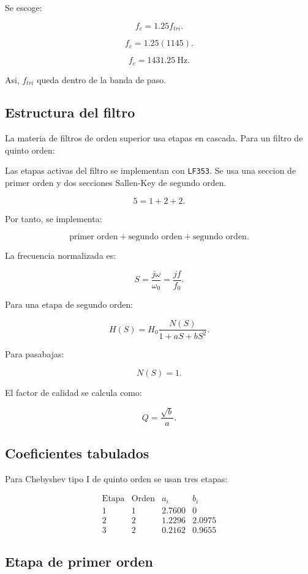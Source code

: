 \documentclass[11pt,letterpaper]{article}
\begin{document}
Se escoge:

\[
f_c=1.25f_{tri}.
\]

\[
f_c=1.25(1145).
\]

\[
\boxed{f_c=1431.25~\text{Hz}}.
\]

Asi, \(f_{tri}\) queda dentro de la banda de paso.

\subsection{Estructura del filtro}

La materia de filtros de orden superior usa etapas en cascada. Para un filtro
de quinto orden:

Las etapas activas del filtro se implementan con \texttt{LF353}. Se usa una
seccion de primer orden y dos secciones Sallen-Key de segundo orden.

\[
5=1+2+2.
\]

Por tanto, se implementa:

\[
\text{primer orden} + \text{segundo orden} + \text{segundo orden}.
\]

La frecuencia normalizada es:

\[
S=\frac{j\omega}{\omega_0}=\frac{jf}{f_0}.
\]

Para una etapa de segundo orden:

\[
H(S)=H_0\frac{N(S)}{1+aS+bS^2}.
\]

Para pasabajas:

\[
N(S)=1.
\]

El factor de calidad se calcula como:

\[
Q=\frac{\sqrt{b}}{a}.
\]

\subsection{Coeficientes tabulados}

Para Chebyshev tipo I de quinto orden se usan tres etapas:

\[
\begin{array}{c|c|c|c}
\text{Etapa} & \text{Orden} & a_i & b_i \\
\hline
1 & 1 & 2.7600 & 0\\
2 & 2 & 1.2296 & 2.0975\\
3 & 2 & 0.2162 & 0.9655
\end{array}
\]

\subsection{Etapa de primer orden}
\end{document}
